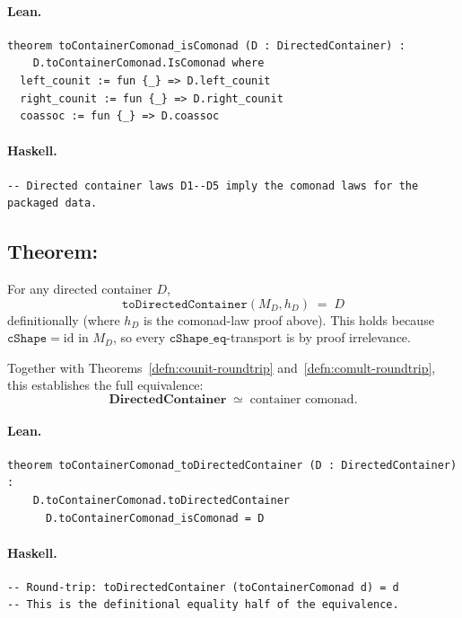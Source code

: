 \documentclass[11pt,a4paper]{article}
\begin{document}
\paragraph{Lean.}
\begin{lstlisting}[style=lean]
theorem toContainerComonad_isComonad (D : DirectedContainer) :
    D.toContainerComonad.IsComonad where
  left_counit := fun {_} => D.left_counit
  right_counit := fun {_} => D.right_counit
  coassoc := fun {_} => D.coassoc
\end{lstlisting}

\paragraph{Haskell.}
\begin{lstlisting}[style=haskell]
-- Directed container laws D1--D5 imply the comonad laws for the packaged data.
\end{lstlisting}


\subsection{Theorem: }

\begin{thm}
For any directed container $D$,
\[
  \mathtt{toDirectedContainer}(M_D, h_D) \;=\; D
\]
definitionally (where $h_D$ is the comonad-law proof above).  This holds
because $\mathtt{cShape} = \mathrm{id}$ in $M_D$, so every
$\mathtt{cShape\_eq}$-transport is  by proof irrelevance.

Together with Theorems~\ref{defn:counit-roundtrip} and~\ref{defn:comult-roundtrip},
this establishes the full equivalence:
\[
  \mathbf{DirectedContainer} \;\simeq\; \text{container comonad}.
\]
\end{thm}

\paragraph{Lean.}
\begin{lstlisting}[style=lean]
theorem toContainerComonad_toDirectedContainer (D : DirectedContainer) :
    D.toContainerComonad.toDirectedContainer
      D.toContainerComonad_isComonad = D
\end{lstlisting}

\paragraph{Haskell.}
\begin{lstlisting}[style=haskell]
-- Round-trip: toDirectedContainer (toContainerComonad d) = d
-- This is the definitional equality half of the equivalence.
\end{lstlisting}
\end{document}
